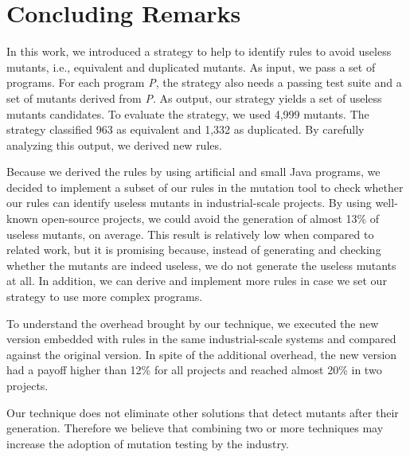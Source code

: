 \chapter{Concluding Remarks}

In this work, we introduced a strategy to help to identify rules to avoid useless mutants, i.e., equivalent and duplicated mutants. 
As input, we pass a set of programs. 
For each program \textit{P}, the strategy also needs a passing test suite and a set of mutants derived from \textit{P}. 
As output, our strategy yields a set of useless mutants candidates. 
To evaluate the strategy, we used 4,999 mutants. 
The strategy classified 963 as equivalent and 1,332 as duplicated. 
By carefully analyzing this output, we derived \NumberOfNewHeuristics new rules. 

Because we derived the rules by using artificial and small Java programs, we decided to implement a subset of our rules in the \mujava{} mutation tool to check whether our rules can identify useless mutants in industrial-scale projects. 
By using well-known open-source projects, we could avoid the generation of almost 13\% of useless mutants, on average. 
This result is relatively low when compared to related work, but it is promising because, instead of generating and checking whether the mutants are indeed useless, we do not generate the useless mutants at all. 
In addition, we can derive and implement more rules in case we set our strategy to use more complex programs.

To understand the overhead brought by our technique, we executed the new \mujava{} version embedded with \NumberOfImplementedHeuristics rules in the same industrial-scale systems and compared against the original \mujava{} version.
In spite of the additional overhead, the new \mujava{} version had a payoff higher than 12\% for all projects and reached almost 20\% in two projects. 

Our technique does not eliminate other solutions that detect mutants after their generation. 
Therefore we believe that combining two or more techniques may increase the adoption of mutation testing by the industry.


